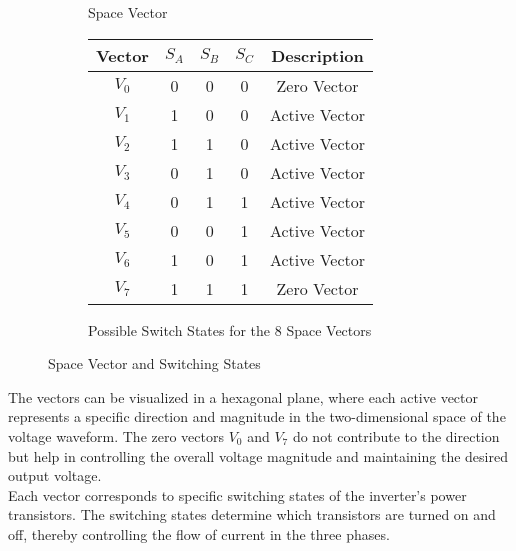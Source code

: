 \begin{figure}[ht]
\begin{subfigure}[b]{0.45\textwidth}
{
        }
        \caption{Space Vector}
        \label{fig:SVM}
    \end{subfigure}
    \hfill
    \begin{subfigure}[b]{0.45\textwidth}
        \centering
        \begin{tabular}{|c|c|c|c|c|}
            \hline
            Vector  & \(S_A\) & \(S_B\) & \(S_C\) & Description   \\ \hline
            \(V_0\) & 0       & 0       & 0       & Zero Vector   \\ \hline
            \(V_1\) & 1       & 0       & 0       & Active Vector \\ \hline
            \(V_2\) & 1       & 1       & 0       & Active Vector \\ \hline
            \(V_3\) & 0       & 1       & 0       & Active Vector \\ \hline
            \(V_4\) & 0       & 1       & 1       & Active Vector \\ \hline
            \(V_5\) & 0       & 0       & 1       & Active Vector \\ \hline
            \(V_6\) & 1       & 0       & 1       & Active Vector \\ \hline
            \(V_7\) & 1       & 1       & 1       & Zero Vector   \\ \hline
        \end{tabular}
        \caption{Possible Switch States for the 8 Space Vectors}
        \label{tab:switch_states}
    \end{subfigure}
    \caption{Space Vector and Switching States}
    \label{fig:combined}
\end{figure}

The vectors can be visualized in a hexagonal plane, where each active vector
represents a specific direction and magnitude in the two-dimensional space of
the voltage waveform. The zero vectors $V_0$ and $V_7$ do not contribute to the
direction but help in controlling the overall voltage magnitude and maintaining
the desired output voltage.\\

Each vector corresponds to specific switching states of the inverter's power
transistors. The switching states determine which transistors are turned on and
off, thereby controlling the flow of current in the three phases.

